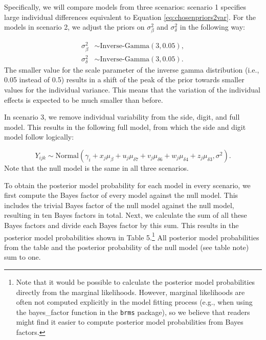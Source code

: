 \documentclass[
  english,
  doc,floatsintext]{apa6}
\begin{document}
Specifically, we will compare models from three scenarios: scenario 1 specifies large individual differences equivalent to Equation \eqref{eq:chosenpriors2var}. For the models in scenario 2, we adjust the priors on \(\sigma^2_{\beta}\) and \(\sigma^2_{\delta}\) in the following way:

\begin{equation}
\begin{aligned}
\sigma^2_{\beta} &\sim \text{Inverse-Gamma}(3, 0.05), \\   
\sigma^2_{\delta} &\sim \text{Inverse-Gamma}(3, 0.05). 
\end{aligned}
\end{equation}
The smaller value for the scale parameter of the inverse gamma distribution (i.e., 0.05 instead of 0.5) results in a shift of the peak of the prior towards smaller values for the individual variance. This means that the variation of the individual effects is expected to be much smaller than before.

In scenario 3, we remove individual variability from the side, digit, and full model. This results in the following full model, from which the side and digit model follow logically:

\begin{equation}
Y_{ijk} \sim \text{Normal}(\gamma_{i} + x_j \mu_\beta + u_j \mu_{\delta{7}} + v_j \mu_{\delta{6}} + w_j \mu_{\delta{4}} + z_j \mu_{\delta{3}}, \sigma^2). \label{eq:datalevel2}
\end{equation}
Note that the null model is the same in all three scenarios.

To obtain the posterior model probability for each model in every scenario, we first compute the Bayes factor of every model against the null model. This includes the trivial Bayes factor of the null model against the null model, resulting in ten Bayes factors in total. Next, we calculate the sum of all these Bayes factors and divide each Bayes factor by this sum. This results in the posterior model probabilities shown in Table 5.\footnote{Note that it would be possible to calculate the posterior model probabilities directly from the marginal likelihoods. However, marginal likelihoods are often not computed explicitly in the model fitting process (e.g., when using the bayes\_factor function in the \texttt{brms} package), so we believe that readers might find it easier to compute posterior model probabilities from Bayes factors.} All posterior model probabilities from the table and the posterior probability of the null model (see table note) sum to one.
\end{document}
